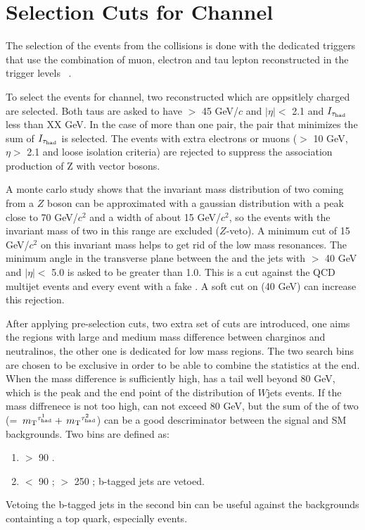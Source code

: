 \section{\texorpdfstring{Selection Cuts for \Tau\Tau Channel}{Selection Cuts for Tau-Tau Channel}}
\label{sect:tauTauCuts}
The selection of the events from the collisions is done with the dedicated triggers that use the combination of muon, electron 
and tau lepton reconstructed in the trigger levels ~\cite{CMS:2013hoa,Chatrchyan:2012xi,Chatrchyan:2011nv}.

To select the events for \Tau\Tau channel, two reconstructed \Tau which are oppsitlely charged are selected. Both taus are asked to 
have \PT $>$ 45 GeV/$c$ and $|\eta| <$ 2.1 and $I_{\tau_{\rm had}}$ less than XX GeV. In the case of more than one pair, the pair that minimizes the sum of
$I_{\tau_{\rm had}}$ is selected.
The events with extra electrons or muons (\PT $>$ 10 GeV, $\eta >$ 2.1 and loose isolation criteria) 
are rejected to suppress the association production of Z with vector bosons.

A monte carlo study shows that the invariant mass distribution of two \Tau coming from a $Z$ boson can be approximated with a gaussian 
distribution with a peak close to 70 GeV/$c^2$ and a width of about 15 GeV/$c^2$, so the events with the invariant mass of  
two \Tau in this range are excluded ($Z$-veto). A minimum cut of 15 GeV/$c^2$ on this invariant mass helps to get rid of the low mass
resonances. The minimum angle in the transverse plane between the \MET and the jets with \PT $>$ 40 GeV and $|\eta| <$ 5.0 
is asked to be greater than 1.0. This is a cut against the QCD multijet events and every event with a fake \MET. A soft cut on 
\mttwo (40 GeV) can increase this rejection.

After applying pre-selection cuts, two extra set of cuts are introduced, one aims the regions with large and medium mass difference between 
charginos and neutralinos, the other one is dedicated for low mass regions. The two search bins are chosen to be exclusive in order 
to be able to combine the statistics at the end. When the mass difference is sufficiently high, \mttwo has a tail well beyond 80 GeV, which is 
the peak  and the end point of the \mt distribution of $W$jets events. If the mass diffrenece is not too high, \mttwo can not exceed 80 GeV, 
but the sum of the \mt of two \Tau (\SumMT = $\,{m_{\rm T}}^{\tau_{\rm had}^1} + \,{m_{\rm T}}^{\tau_{\rm had}^2}$) can be a good descriminator between the signal and SM backgrounds. 
Two bins are defined as:
\begin{enumerate}
\item \mttwo $>$ 90 \GeV.
\item \mttwo $<$ 90 \GeV; \SumMT $>$ 250 \GeV; b-tagged jets are vetoed.
\end{enumerate}
Vetoing the b-tagged jets in the second bin can be useful against the backgrounds containting a top quark, especially \ttbar events. 


